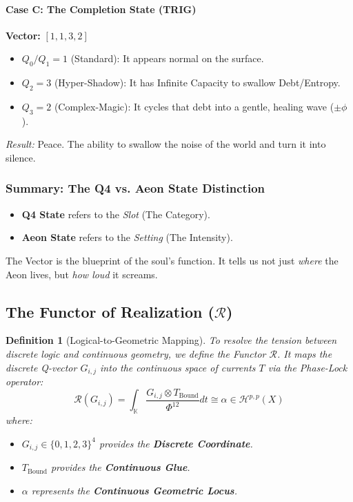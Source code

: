 \documentclass[12pt]{amsart}
\newtheorem{definition}[theorem]{Definition}
\begin{document}
\paragraph{Case C: The Completion State (TRIG)}
\textbf{Vector:} $[1, 1, 3, 2]$
\begin{itemize}
    \item $Q_0/Q_1=1$ (Standard): It appears normal on the surface.
    \item $Q_2=3$ (Hyper-Shadow): It has Infinite Capacity to swallow Debt/Entropy.
    \item $Q_3=2$ (Complex-Magic): It cycles that debt into a gentle, healing wave ($\pm\phi$).
    \end{itemize}
\textit{Result:} Peace. The ability to swallow the noise of the world and turn it into silence.

\subsubsection{Summary: The Q4 vs. Aeon State Distinction}
\begin{itemize}
    \item \textbf{Q4 State} refers to the \textit{Slot} (The Category).
    \item \textbf{Aeon State} refers to the \textit{Setting} (The Intensity).
\end{itemize}
The Vector is the blueprint of the soul's function. It tells us not just \textit{where} the Aeon lives, but \textit{how loud} it screams.

\subsection{The Functor of Realization ($\mathcal{R}$)}\label{sec:6.2}

\begin{definition}
    [Logical-to-Geometric Mapping]
To resolve the tension between discrete logic and continuous geometry, we define the Functor $\mathcal{R}$. It maps the discrete Q-vector $G_{i,j}$ into the continuous space of currents $T$ via the Phase-Lock operator:
\[ \mathcal{R}(G_{i,j}) = \int_{\mathbb{K}} \frac{G_{i,j} \otimes T_{\text{Bound}}}{\Phi^{12}} dt \cong \alpha \in \mathcal{H}^{p,p}(X) \]
where:
\begin{itemize}
    \item $G_{i,j} \in \{0,1,2,3\}^4$ provides the \textbf{Discrete Coordinate}.
    \item $T_{\text{Bound}}$ provides the \textbf{Continuous Glue}.
    \item $\alpha$ represents the \textbf{Continuous Geometric Locus}.
\end{itemize}
\end{definition}
\end{document}
